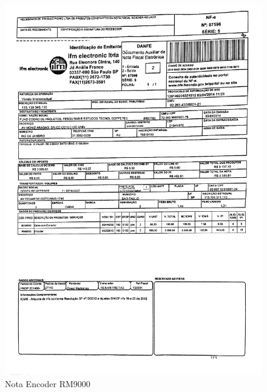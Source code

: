 \begin{figure}[h!]
 \centering
 \includegraphics[width=1\columnwidth]{Encoder/nota_encoder.pdf}
 \caption{Nota Encoder RM9000}
 \end{figure} 